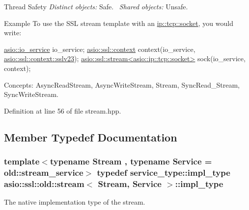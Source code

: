 \begin{DoxyParagraph}{Thread Safety}
{\itshape Distinct} {\itshape objects\+:} Safe.~\newline
{\itshape Shared} {\itshape objects\+:} Unsafe.
\end{DoxyParagraph}
\begin{DoxyParagraph}{Example}
To use the S\+S\+L stream template with an \hyperlink{classasio_1_1ip_1_1tcp_a6f5bf95251747bb81d75784387938d6a}{ip\+::tcp\+::socket}, you would write\+: 
\begin{DoxyCode}
\hyperlink{classasio_1_1io__service}{asio::io\_service} io\_service;
\hyperlink{classasio_1_1ssl_1_1context}{asio::ssl::context} context(io\_service, 
      \hyperlink{classasio_1_1ssl_1_1context__base_ac37d498266e3b13607f011ace6417525ae478c3ede58b50c99d6c6ff9ed7c0124}{asio::ssl::context::sslv23});
\hyperlink{classasio_1_1ssl_1_1stream}{asio::ssl::stream<asio::ip::tcp::socket>} sock(io\_service, context);
\end{DoxyCode}

\end{DoxyParagraph}
\begin{DoxyParagraph}{Concepts\+:}
Async\+Read\+Stream, Async\+Write\+Stream, Stream, Sync\+Read\+\_\+\+Stream, Sync\+Write\+Stream. 
\end{DoxyParagraph}


Definition at line 56 of file stream.\+hpp.



\subsection{Member Typedef Documentation}
\hypertarget{classasio_1_1ssl_1_1old_1_1stream_a965fd8deeebbf308d18fbac925009d8d}{}
\subsubsection[{impl\+\_\+type}]{\setlength{\rightskip}{0pt plus 5cm}template$<$typename Stream , typename Service  = old\+::stream\+\_\+service$>$ typedef service\+\_\+type\+::impl\+\_\+type {\bf asio\+::ssl\+::old\+::stream}$<$ Stream, Service $>$\+::{\bf impl\+\_\+type}}\label{classasio_1_1ssl_1_1old_1_1stream_a965fd8deeebbf308d18fbac925009d8d}


The native implementation type of the stream. 



